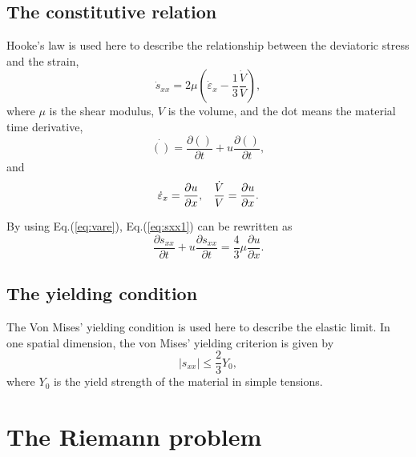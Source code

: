 \documentclass[review]{elsarticle}
\numberwithin{equation}{section}
\numberwithin{table}{section}
\begin{document}
\subsection{The constitutive relation}
Hooke's law is used here to describe the relationship between the deviatoric stress and the strain,
\begin{equation}\label{eq:sxx1}
\dot{s}_{xx} = 2\mu \left(\dot{\varepsilon}_x-\frac{1}{3}\frac{\dot{V}}{V}\right),
\end{equation}
where $\mu$ is the shear modulus, $V$ is the volume, and the dot means the material time derivative,
\begin{equation}\label{eq:mt}
  \dot{()} = \frac{\partial ()}{\partial t} + u \frac{\partial ()}{\partial t},
\end{equation}
and
\begin{equation}\label{eq:vare}
  \dot{\varepsilon}_x = \frac{\partial u}{\partial x}, \hspace{0.3cm} \frac{\dot{V}}{V} = \frac{\partial u}{\partial x}.
\end{equation}

By using Eq.(\ref{eq:vare}), Eq.(\ref{eq:sxx1}) can be rewritten as
\begin{equation}\label{eq:sxx}
  \frac{\partial s_{xx}}{\partial t} + u \frac{\partial s_{xx}}{\partial t} =\frac{4}{3}\mu \frac{\partial u}{\partial x}.
\end{equation}

\subsection{The yielding condition}
The Von Mises' yielding condition is used here to describe the elastic limit. In one spatial dimension, the von Mises' yielding criterion is given by
\begin{equation}
  |s_{xx}| \le \frac{2}{3}Y_0,
\end{equation}
where $Y_0$ is the yield strength of the material in  simple tensions.

\section{The Riemann problem}\label{sec:Riemann}
\end{document}
